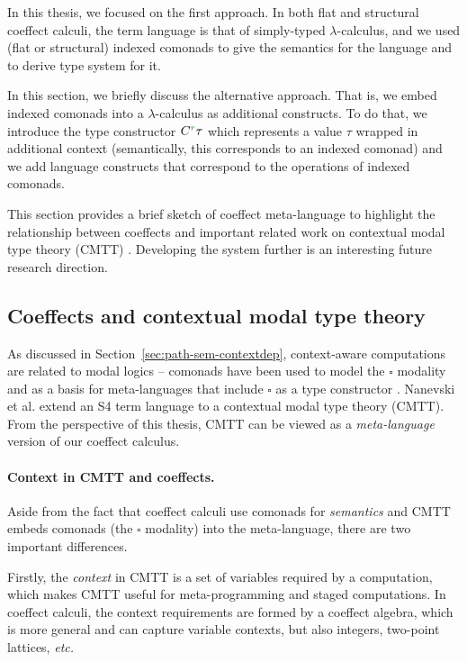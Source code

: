 In this thesis, we focused on the first approach. In both flat and structural coeffect calculi,
the term language is that of simply-typed $\lambda$-calculus, and we used (flat or structural)
indexed comonads to give the semantics for the language and to derive type system for it.

In this section, we briefly discuss the alternative approach. That is, we embed indexed
comonads into a $\lambda$-calculus as additional constructs. To do that, we introduce the
type constructor $\ctyp{\cclrd{r}}{\tau}$ which represents a value $\tau$ wrapped in additional
context (semantically, this corresponds to an indexed comonad) and we add language constructs
that correspond to the operations of indexed comonads.

This section provides a brief sketch of coeffect meta-language to highlight the relationship
between coeffects and important related work on contextual modal type theory (CMTT) \cite{logic-cmtt}.
Developing the system further is an interesting future research direction.


\subsection{Coeffects and contextual modal type theory}

As discussed in Section~\ref{sec:path-sem-contextdep}, context-aware computations are related
to modal logics -- comonads have been used to model the $\square$ modality and as a basis for
meta-languages that include $\square$ as a type constructor
\cite{logic-intuitionistic-modal,logic-modal-reconstruction,logic-intuitionistic-modal,logic-cmtt}.
Nanevski et al. \cite{logic-cmtt} extend an S4 term language to a contextual modal type theory (CMTT).
From the perspective of this thesis, CMTT can be viewed as a \emph{meta-language} version of our
coeffect calculus.

\paragraph{Context in CMTT and coeffects.}
Aside from the fact that coeffect calculi use comonads for \emph{semantics} and CMTT embeds
comonads (the $\square$ modality) into the meta-language, there are two important differences.

Firstly, the \emph{context} in CMTT is a set of variables required by a computation, which
makes CMTT useful for meta-programming and staged computations. In coeffect calculi, the context
requirements are formed by a coeffect algebra, which is more general and can capture
variable contexts, but also integers, two-point lattices, \emph{etc.}

